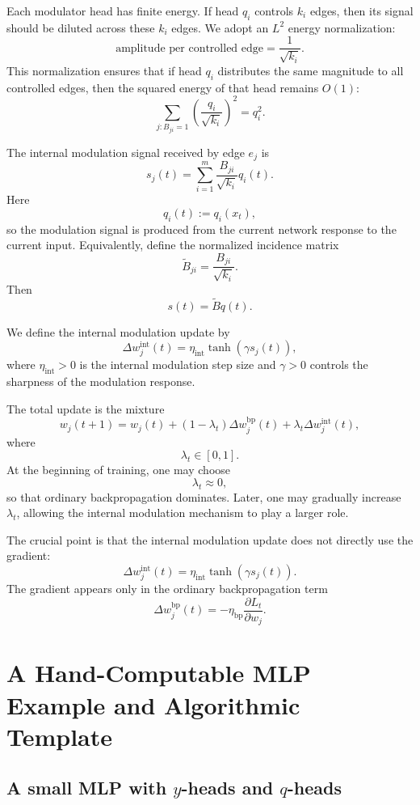 \documentclass[11pt]{article}
\newcommand{\1}{\mathbf{1}}
\begin{document}
Each modulator head has finite energy. If head \(q_i\) controls \(k_i\) edges, then its signal should be diluted across these \(k_i\) edges. We adopt an \(L^2\) energy normalization:
\[
\text{amplitude per controlled edge}
=
\frac{1}{\sqrt{k_i}}.
\]
This normalization ensures that if head \(q_i\) distributes the same magnitude to all controlled edges, then the squared energy of that head remains \(O(1)\):
\[
\sum_{j:B_{ji}=1}
\left(
\frac{q_i}{\sqrt{k_i}}
\right)^2
=
q_i^2.
\]

The internal modulation signal received by edge \(e_j\) is
\[
s_j(t)
=
\sum_{i=1}^m
\frac{B_{ji}}{\sqrt{k_i}}q_i(t).
\]
Here
\[
q_i(t):=q_i(x_t),
\]
so the modulation signal is produced from the current network response to the current input.
Equivalently, define the normalized incidence matrix
\[
\widetilde B_{ji}
=
\frac{B_{ji}}{\sqrt{k_i}}.
\]
Then
\[
s(t)=\widetilde B q(t).
\]

We define the internal modulation update by
\[
\Delta w_j^{\mathrm{int}}(t)
=
\eta_{\mathrm{int}}
\tanh(\gamma s_j(t)),
\]
where \(\eta_{\mathrm{int}}>0\) is the internal modulation step size and \(\gamma>0\) controls the sharpness of the modulation response.

The total update is the mixture
\[
w_j(t+1)
=
w_j(t)
+
(1-\lambda_t)\Delta w_j^{\mathrm{bp}}(t)
+
\lambda_t\Delta w_j^{\mathrm{int}}(t),
\]
where
\[
\lambda_t\in[0,1].
\]
At the beginning of training, one may choose
\[
\lambda_t\approx 0,
\]
so that ordinary backpropagation dominates. Later, one may gradually increase \(\lambda_t\), allowing the internal modulation mechanism to play a larger role.

The crucial point is that the internal modulation update does not directly use the gradient:
\[
\Delta w_j^{\mathrm{int}}(t)
=
\eta_{\mathrm{int}}\tanh(\gamma s_j(t)).
\]
The gradient appears only in the ordinary backpropagation term
\[
\Delta w_j^{\mathrm{bp}}(t)
=
-\eta_{\mathrm{bp}}
\frac{\partial L_t}{\partial w_j}.
\]

\section{A Hand-Computable MLP Example and Algorithmic Template}

\subsection{A small MLP with \texorpdfstring{$y$}{y}-heads and \texorpdfstring{$q$}{q}-heads}
\end{document}
